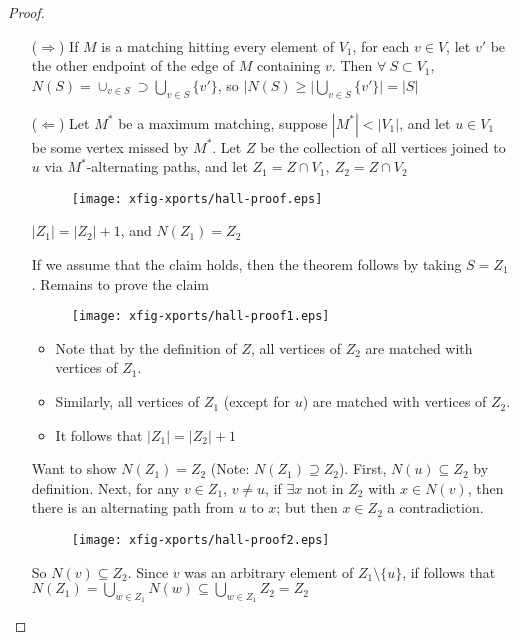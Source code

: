 \documentclass{article}
\begin{document}
\begin{proof}
\begin{itemize}
 \item[($\Rightarrow$)] If $M$ is a matching hitting every element of $V_1$, for each $v \in V$, let $v'$ be the other endpoint of the edge of $M$ containing $v$.  Then $\forall ~ S \subset V_1$, $N(S) = \cup_{v \in S} \supset \displaystyle\bigcup_{v \in S} \{v'\}$, so $|N(S)\geq |\displaystyle\bigcup_{v\in S}\{v'\}|=|S|$
\item[($\Leftarrow$)] Let $M^*$ be a maximum matching, suppose $|M^*| < |V_1|$, and let $u \in V_1$ be some vertex missed by $M^*$.  Let $Z$ be the collection of all vertices joined to $u$ via $M^*$-alternating paths, and let $Z_1=Z \cap V_1 ,~ Z_2 = Z \cap V_2$

\begin{figure}[H]
\centering
\texttt{[image: xfig-xports/hall-proof.eps]}
\end{figure}


\begin{clm}
$|Z_1| = |Z_2| +1$, and $N(Z_1) = Z_2$
\end{clm}

If we assume that the claim holds, then the theorem follows by taking $S=Z_1$.  Remains to prove the claim

\begin{figure}[H]
 \centering
\texttt{[image: xfig-xports/hall-proof1.eps]}
\end{figure}

\begin{itemize}
\item Note that by the definition of $Z$, all vertices of $Z_2$ are matched with vertices of $Z_1$.
\item Similarly, all vertices of $Z_1$  (except for $u$) are matched with vertices of $Z_2$.
\item It follows that $|Z_1| = |Z_2| +1 $
\end{itemize}

Want to show $N(Z_1) = Z_2$ (Note: $N(Z_1) \supseteq Z_2$).  First, $N(u) \subseteq Z_2$ by definition.  Next, for any $v \in Z_1$, $v \neq u$, if $\exists x $ not in $Z_2$ with $x\in N(v)$, then there is an alternating path from $u$ to $x$; but then $x \in Z_2$ a contradiction.

\begin{figure}[H]
 \centering
\texttt{[image: xfig-xports/hall-proof2.eps]}
\end{figure}

So $N(v) \subseteq Z_2$.  Since $v$ was an arbitrary element of $Z_1 \setminus \{u\}$, if follows that $N(Z_1) = \displaystyle\bigcup_{w \in Z_1} N(w) \subseteq \bigcup_{w \in Z_1} Z_2 = Z_2$
\end{itemize}
\end{proof}
\end{document}
